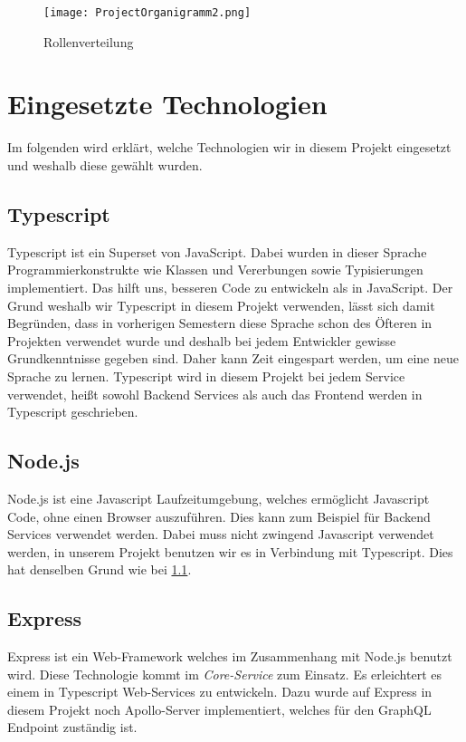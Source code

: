     \begin{figure}[!hbt]
        \texttt{[image: ProjectOrganigramm2.png]}
        \caption{Rollenverteilung}
        \label{fig:Rollenverteilung}
    \end{figure}
    
\section{Eingesetzte Technologien}
Im folgenden wird erklärt, welche Technologien wir in diesem Projekt eingesetzt und weshalb diese gewählt wurden.

\subsection{Typescript} \label{sub:Typescript}
    Typescript ist ein Superset von JavaScript. Dabei wurden in dieser Sprache Programmierkonstrukte wie Klassen und Vererbungen sowie Typisierungen implementiert. Das hilft uns, besseren Code zu entwickeln als in JavaScript.
    Der Grund weshalb wir Typescript in diesem Projekt verwenden, lässt sich damit Begründen, dass in vorherigen Semestern diese Sprache schon des Öfteren in Projekten verwendet wurde und deshalb bei jedem Entwickler gewisse Grundkenntnisse
    gegeben sind. Daher kann Zeit eingespart werden, um eine neue Sprache zu lernen. Typescript wird in diesem Projekt bei jedem Service verwendet, heißt sowohl Backend Services als auch das Frontend werden in Typescript geschrieben.
\subsection{Node.js}
    Node.js ist eine Javascript Laufzeitumgebung, welches ermöglicht Javascript Code, ohne einen Browser auszuführen. Dies kann zum Beispiel für Backend Services verwendet werden. Dabei muss nicht zwingend Javascript verwendet werden,
    in unserem Projekt benutzen wir es in Verbindung mit Typescript. Dies hat denselben Grund wie bei \ref{sub:Typescript}.
\subsection{Express}
    Express ist ein Web-Framework welches im Zusammenhang mit Node.js benutzt wird. Diese Technologie kommt im \textit{Core-Service} zum Einsatz. Es erleichtert es einem in Typescript Web-Services zu entwickeln.
    Dazu wurde auf Express in diesem Projekt noch Apollo-Server implementiert, welches für den GraphQL Endpoint zuständig ist.
